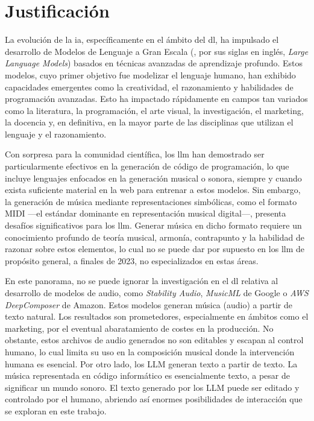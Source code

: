 \chapter{Justificación}


La evolución de la \gls{ia}, específicamente en el ámbito del \gls{dl}, ha impulsado el desarrollo de Modelos de Lenguaje a Gran Escala (, por sus siglas en inglés, \textit{Large Language Models}) basados en técnicas avanzadas de aprendizaje profundo. Estos modelos, cuyo primer objetivo fue modelizar el lenguaje humano, han exhibido capacidades emergentes como la creatividad, el razonamiento y habilidades de programación avanzadas. Esto ha impactado rápidamente en campos tan variados como la literatura, la programación, el arte visual, la investigación, el marketing, la docencia y, en definitiva, en la mayor parte de las disciplinas que utilizan el lenguaje y el razonamiento.

Con sorpresa para la comunidad científica, los \gls{llm} han demostrado ser particularmente efectivos en la generación de código de programación, lo que incluye lenguajes enfocados en la generación musical o sonora, siempre y cuando exista suficiente material en la web para entrenar a estos modelos. Sin embargo, la generación de música mediante representaciones simbólicas, como el formato MIDI —el estándar dominante en representación musical digital—, presenta desafíos significativos para los \gls{llm}. Generar música en dicho formato requiere un conocimiento profundo de teoría musical, armonía, contrapunto y la habilidad de razonar sobre estos elementos, lo cual no se puede dar por supuesto en los \gls{llm} de propósito general, a finales de 2023, no especializados en estas áreas.

En este panorama, no se puede ignorar la investigación en el \gls{dl} relativa al desarrollo de modelos de audio, como \textit{Stability Audio}, \textit{MusicML} de Google o \textit{AWS DeepComposer} de Amazon. Estos modelos generan música (audio) a partir de texto natural. Los resultados son prometedores, especialmente en ámbitos como el marketing, por el eventual abaratamiento de costes en la producción. No obstante, estos archivos de audio generados no son editables y escapan al control humano, lo cual limita su uso en la composición musical donde la intervención humana es esencial. Por otro lado, los LLM generan texto a partir de texto. La música representada en código informático es esencialmente texto, a pesar de significar un mundo sonoro. El texto generado por los LLM puede ser editado y controlado por el humano, abriendo así enormes posibilidades de interacción que se exploran en este trabajo.

